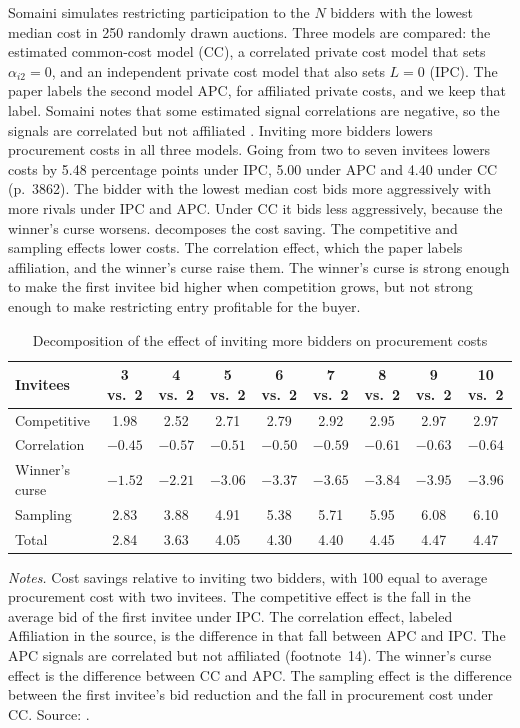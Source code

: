  Somaini simulates restricting participation to the $N$ bidders with the lowest median
cost in 250 randomly drawn auctions. Three models are compared: the estimated common-cost model (CC), a
correlated private cost model that sets $\alpha_{i2}=0$, and an independent private cost model that also sets
$L=0$ (IPC). The paper labels the second model APC, for affiliated private costs, and we keep that label.
Somaini notes that some estimated signal correlations are negative, so the signals are correlated but not
affiliated \citep[footnote~14]{Somaini2020}. Inviting more bidders lowers procurement costs in all three models. Going from two to seven
invitees lowers costs by 5.48 percentage points under IPC, 5.00 under APC and 4.40 under CC (p.~3862). The bidder
with the lowest median cost bids more aggressively with more rivals under IPC and APC. Under CC it bids less
aggressively, because the winner's curse worsens.  decomposes the cost saving. The
competitive and sampling effects lower costs. The correlation effect, which the paper labels affiliation, and the
winner's curse raise them. The winner's curse is
strong enough to make the first invitee bid higher when competition grows, but not strong enough to make
restricting entry profitable for the buyer.

\begin{table}[htbp]
\centering
\caption{Decomposition of the effect of inviting more bidders on procurement costs}\label{tab:15-somaini-comp}
\small
\begin{tabular}{@{}lcccccccc@{}}
\toprule
Invitees & 3 vs.\ 2 & 4 vs.\ 2 & 5 vs.\ 2 & 6 vs.\ 2 & 7 vs.\ 2 & 8 vs.\ 2 & 9 vs.\ 2 & 10 vs.\ 2 \\
\midrule
Competitive & 1.98 & 2.52 & 2.71 & 2.79 & 2.92 & 2.95 & 2.97 & 2.97 \\
Correlation & $-0.45$ & $-0.57$ & $-0.51$ & $-0.50$ & $-0.59$ & $-0.61$ & $-0.63$ & $-0.64$ \\
Winner's curse & $-1.52$ & $-2.21$ & $-3.06$ & $-3.37$ & $-3.65$ & $-3.84$ & $-3.95$ & $-3.96$ \\
Sampling & 2.83 & 3.88 & 4.91 & 5.38 & 5.71 & 5.95 & 6.08 & 6.10 \\
Total & 2.84 & 3.63 & 4.05 & 4.30 & 4.40 & 4.45 & 4.47 & 4.47 \\
\bottomrule
\end{tabular}

\smallskip
\begin{minipage}{0.95\textwidth}
\footnotesize \textit{Notes.} Cost savings relative to inviting two bidders, with 100 equal to average procurement cost
with two invitees. The competitive effect is the fall in the average bid of the first invitee under IPC. The
correlation effect, labeled Affiliation in the source, is the difference in that fall between APC and IPC.
The APC signals are correlated but not affiliated (footnote~14). The winner's curse effect is the
difference between CC and APC. The sampling effect is the difference between the first invitee's bid reduction
and the fall in procurement cost under CC. Source: \citet[Table~8, top panel]{Somaini2020}.
\end{minipage}
\end{table}

